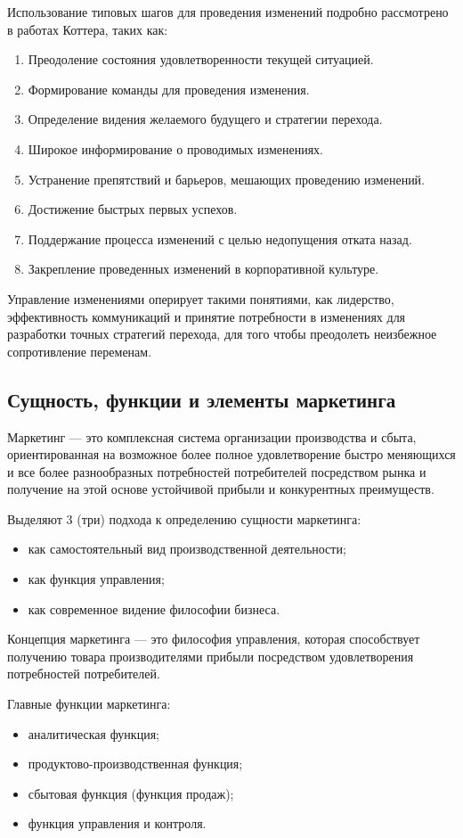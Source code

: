 \documentclass[a4paper,12pt,oneside,final]{extarticle}
\numberwithin{equation}{section}
\begin{document}
\begin{enumerate}
Использование типовых шагов для проведения изменений подробно рассмотрено в работах Коттера, таких как:
\begin{enumerate}
	\item Преодоление состояния удовлетворенности текущей ситуацией.
	\item Формирование команды для проведения изменения.
	\item Определение видения желаемого будущего и стратегии перехода.
	\item Широкое информирование о проводимых изменениях.
	\item Устранение препятствий и барьеров, мешающих проведению изменений.
	\item Достижение быстрых первых успехов.
	\item Поддержание процесса изменений с целью недопущения отката назад.
	\item Закрепление проведенных изменений в корпоративной культуре.
\end{enumerate}

Управление изменениями оперирует такими понятиями, как лидерство, эффективность коммуникаций и принятие потребности в изменениях для разработки точных стратегий перехода, для того чтобы преодолеть неизбежное сопротивление переменам.

\subsection{Сущность, функции и элементы маркетинга}
Маркетинг --- это комплексная система организации производства и сбыта, ориентированная на возможное более полное удовлетворение быстро меняющихся и все более разнообразных потребностей потребителей посредством рынка и получение на этой основе устойчивой прибыли и конкурентных преимуществ.

Выделяют 3 (три) подхода к определению сущности маркетинга:
\begin{itemize}
	\item как самостоятельный вид производственной деятельности;
	\item как функция управления;
	\item как современное видение философии бизнеса.
\end{itemize}

Концепция маркетинга --- это философия управления, которая способствует получению товара производителями прибыли посредством удовлетворения потребностей потребителей.

Главные функции маркетинга:
\begin{itemize}
	\item аналитическая функция;
	\item продуктово-производственная функция;
	\item сбытовая функция (функция продаж);
	\item функция управления и контроля.
\end{itemize}


\end{enumerate}
\end{document}
